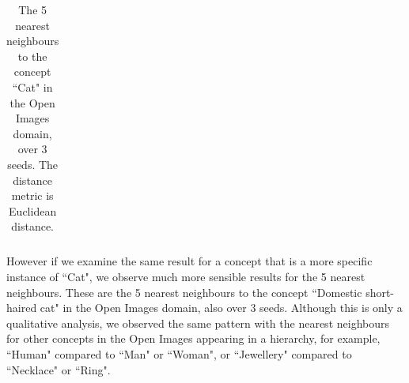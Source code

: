\begin{table}[H]
\begin{tabular}{@{}llll@{}}
\end{tabular}
\centering
\caption{\label{table:cat}The 5 nearest neighbours to the concept ``Cat" in the Open Images domain, over 3 seeds. The distance metric is Euclidean distance.}
\end{table}

However if we examine the same result for a concept that is a more specific instance of ``Cat", we observe much more sensible results for the 5 nearest neighbours. These are the 5 nearest neighbours to the concept ``Domestic short-haired cat" in the Open Images domain, also over 3 seeds. Although this is only a qualitative analysis, we observed the same pattern with the nearest neighbours for other concepts in the Open Images appearing in a hierarchy, for example, ``Human" compared to ``Man" or ``Woman", or ``Jewellery" compared to ``Necklace" or ``Ring". 

